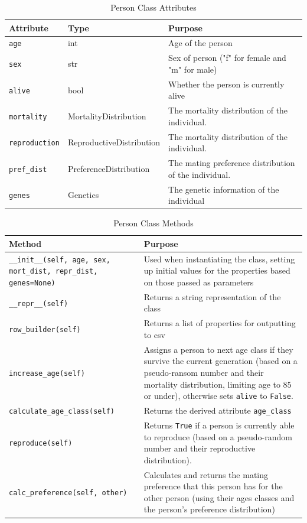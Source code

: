 \documentclass[authoryearcitations]{UoYCSproject}
\begin{document}
\begin{table}[h]
\caption{Person Class Attributes}
\label{tbl:personAttributes}
\begin{tabular}{l l m{5cm}}
\textbf{Attribute} & \textbf{Type} & \textbf{Purpose} \\\hline
\texttt{age} & int & Age of the person \\\hline
\texttt{sex} & str & Sex of person ("f" for female and "m" for male) \\\hline
\texttt{alive} & bool & Whether the person is currently alive \\\hline
\texttt{mortality} & MortalityDistribution & The mortality distribution of the individual. \\\hline
\texttt{reproduction} & ReproductiveDistribution & The mortality distribution of the individual. \\\hline
\texttt{pref\_dist} & PreferenceDistribution & The mating preference distribution of the individual. \\\hline 
\texttt{genes} & Genetics & The genetic information of the individual
\end{tabular}
\end{table}

\begin{table}[h]
\caption{Person Class Methods}
\label{tbl:personMethods}
\begin{tabular}{m{} m{}}
\textbf{Method} & \textbf{Purpose} \\\hline
\texttt{\_\_init\_\_(self, age, sex, mort\_dist, repr\_dist, genes=None)} & Used when instantiating the class, setting up initial values for the properties based on those passed as parameters\\\hline
\texttt{\_\_repr\_\_(self)} & Returns a string representation of the class \\\hline
\texttt{row\_builder(self)} & Returns a list of properties for outputting to csv\\\hline
\texttt{increase\_age(self)} & Assigns a person to next age class if they survive the current generation (based on a pseudo-ransom number and their mortality distribution, limiting age to 85 or under), otherwise sets \texttt{alive} to \texttt{False}.\\\hline
\texttt{calculate\_age\_class(self)} & Returns the derived attribute \texttt{age\_class} \\\hline
\texttt{reproduce(self)} & Returns \texttt{True} if a person is currently able to reproduce (based on a pseudo-random number and their reproductive distribution). \\\hline
\texttt{calc\_preference(self, other)} & Calculates and returns the mating preference that this person has for the other person (using their ages classes and the person's preference distribution) \\\hline
\end{tabular}
\end{table}
\end{document}
